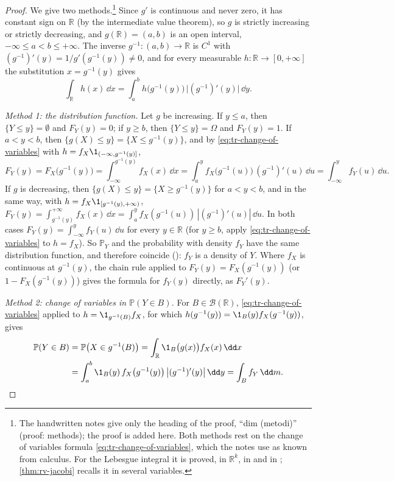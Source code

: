 \begin{proof}
We give two methods.\footnote{The handwritten notes give only the heading of the proof, ``dim
(metodi)'' (proof: methods); the proof is added here. Both methods rest on the change of
variables formula \eqref{eq:tr-change-of-variables}, which the notes use as known from calculus.
For the Lebesgue integral it is proved, in $\mathbb R^k$, in \citet[Section~17]{billingsley} and in
\citet[Chapter~7, on differentiable transformations]{rudin-rca}; \cref{thm:rv-jacobi} recalls it in
several variables.} Since $g'$ is continuous and never zero, it has constant sign on $\mathbb R$ (by
the intermediate value theorem), so $g$ is strictly increasing or strictly decreasing, and
$g(\mathbb R)=(a,b)$ is an open interval, $-\infty\le a<b\le+\infty$. The inverse
$g^{-1}:(a,b)\to\mathbb R$ is $C^1$ with $(g^{-1})'(y)=1/g'(g^{-1}(y))\ne0$, and for every
measurable $h:\mathbb R\to[0,+\infty]$ the substitution $x=g^{-1}(y)$ gives
\begin{equation}\label{eq:tr-change-of-variables}
  \int_{\mathbb R}h(x)\,\dd x=\int_a^bh\big(g^{-1}(y)\big)\,\big|(g^{-1})'(y)\big|\,\dd y .
\end{equation}

\emph{Method 1: the distribution function.} Let $g$ be increasing. If $y\le a$, then
$\{Y\le y\}=\emptyset$ and $F_Y(y)=0$; if $y\ge b$, then $\{Y\le y\}=\Omega$ and $F_Y(y)=1$. If
$a<y<b$, then $\{g(X)\le y\}=\{X\le g^{-1}(y)\}$, and by \eqref{eq:tr-change-of-variables} with
$h=f_X\1_{(-\infty,g^{-1}(y)]}$,
\[
  F_Y(y)=F_X\big(g^{-1}(y)\big)=\int_{-\infty}^{g^{-1}(y)}f_X(x)\,\dd x
  =\int_a^yf_X\big(g^{-1}(u)\big)\,(g^{-1})'(u)\,\dd u=\int_{-\infty}^yf_Y(u)\,\dd u .
\]
If $g$ is decreasing, then $\{g(X)\le y\}=\{X\ge g^{-1}(y)\}$ for $a<y<b$, and in the same way, with
$h=f_X\1_{[g^{-1}(y),+\infty)}$,
$F_Y(y)=\int_{g^{-1}(y)}^{+\infty}f_X(x)\,\dd x=\int_a^yf_X(g^{-1}(u))\,|(g^{-1})'(u)|\,\dd u$.
In both cases $F_Y(y)=\int_{-\infty}^yf_Y(u)\,\dd u$ for every $y\in\mathbb R$ (for $y\ge b$, apply
\eqref{eq:tr-change-of-variables} to $h=f_X$). So $\mathbb P_Y$ and the probability with density
$f_Y$ have the same distribution function, and therefore coincide
(): $f_Y$ is a density of $Y$. Where $f_X$ is continuous at $g^{-1}(y)$, the chain
rule applied to $F_Y(y)=F_X(g^{-1}(y))$ (or $1-F_X(g^{-1}(y))$) gives the formula for $f_Y(y)$
directly, as $F_Y'(y)$.

\emph{Method 2: change of variables in $\mathbb P(Y\in B)$.} For $B\in\mathcal B(\mathbb R)$,
\eqref{eq:tr-change-of-variables} applied to $h=\1_{g^{-1}(B)}f_X$, for which
$h(g^{-1}(y))=\1_B(y)f_X(g^{-1}(y))$, gives
\[
\begin{aligned}
  \mathbb P(Y\in B)&=\mathbb P\big(X\in g^{-1}(B)\big)=\int_{\mathbb R}\1_B\big(g(x)\big)f_X(x)\,\dd x\\
  &=\int_a^b\1_B(y)\,f_X\big(g^{-1}(y)\big)\,\big|(g^{-1})'(y)\big|\,\dd y=\int_Bf_Y\,\dd m .
\end{aligned}\qedhere
\]
\end{proof}

